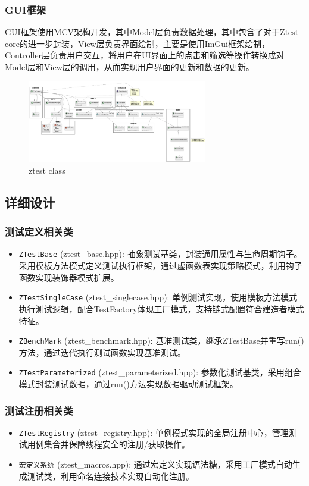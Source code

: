 \documentclass{article}
\begin{document}
\subsubsection{GUI框架}
GUI框架使用MCV架构开发，其中Model层负责数据处理，其中包含了对于Ztest core的进一步封装，View层负责界面绘制，主要是使用ImGui框架绘制，Controller层负责用户交互，将用户在UI界面上的点击和筛选等操作转换成对Model层和View层的调用，从而实现用户界面的更新和数据的更新。
\newpage
\begin{figure}[H]
    \centering
    \includegraphics[angle=270,width=0.7\textwidth]{img/class.png} %
    \caption{ ztest class}
    \label{fig:ztest class }
\end{figure}
\subsection{详细设计}
\subsubsection{测试定义相关类}
\begin{itemize}
    \item \texttt{ZTestBase} (ztest\_base.hpp): 抽象测试基类，封装通用属性与生命周期钩子。采用模板方法模式定义测试执行框架，通过虚函数表实现策略模式，利用钩子函数实现装饰器模式扩展。
    \item \texttt{ZTestSingleCase} (ztest\_singlecase.hpp): 单例测试实现，使用模板方法模式执行测试逻辑，配合TestFactory体现工厂模式，支持链式配置符合建造者模式特征。
    \item \texttt{ZBenchMark} (ztest\_benchmark.hpp): 基准测试类，继承ZTestBase并重写run()方法，通过迭代执行测试函数实现基准测试。
    \item \texttt{ZTestParameterized} (ztest\_parameterized.hpp): 参数化测试基类，采用组合模式封装测试数据，通过run()方法实现数据驱动测试框架。
\end{itemize}

\subsubsection{测试注册相关类}
\begin{itemize}
    \item \texttt{ZTestRegistry} (ztest\_registry.hpp): 单例模式实现的全局注册中心，管理测试用例集合并保障线程安全的注册/获取操作。
    \item \texttt{宏定义系统} (ztest\_macros.hpp): 通过宏定义实现语法糖，采用工厂模式自动生成测试类，利用命名连接技术实现自动化注册。
\end{itemize}
\end{document}
